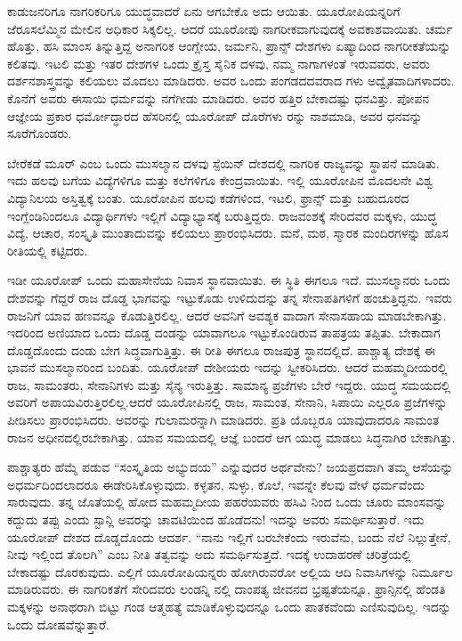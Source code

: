 ಕಾಡುಜನರಿಗೂ ನಾಗರಿಕರಿಗೂ ಯುದ್ಧವಾದರೆ ಏನು ಆಗಬೇಕೊ ಅದು ಆಯಿತು. ಯೂರೋಪಿಯನ್ನರಿಗೆ ಜೆರೂಸಲೆಮ್ಮಿನ ಮೇಲಿನ ಅಧಿಕಾರ ಸಿಕ್ಕಲಿಲ್ಲ. ಆದರೆ ಯೂರೋಪು ನಾಗರೀಕವಾಗುವುದಕ್ಕೆ ಅವಕಾಶವಾಯಿತು. ಚರ್ಮ ಹೊತ್ತು, ಹಸಿ ಮಾಂಸ ತಿನ್ನುತ್ತಿದ್ದ ಅನಾಗರಿಕ ಆಂಗ್ಲೇಯ, ಜರ್ಮನಿ, ಪ್ರಾನ್ಸ್​ ದೇಶಗಳು ಏಷ್ಯಾದಿಂದ ನಾಗರೀಕತೆಯನ್ನು ಕಲಿತವು. ಇಟಲಿ ಮತ್ತು ಇತರ ದೇಶಗಳ ಒಂದು ಕ್ರೈಸ್ತ ಸೈನಿಕ ದಳವು, ನಮ್ಮ ನಾಗಾಗಳಂತೆ ಇರುವವರು, ಅವರು ದರ್ಶನಶಾಸ್ತ್ರವನ್ನು ಕಲಿಯಲು ಮೊದಲು ಮಾಡಿದರು. ಅವರ ಒಂದು ಪಂಗಡದದವರಾದ ಗಳು ಅದ್ವೈತವಾದಿಗಳಾದರು. ಕೊನೆಗೆ ಅವರು ಈಸಾಯಿ ಧರ್ಮವನ್ನು ನಗೆಗೀಡು ಮಾಡಿದರು. ಅವರ ಹತ್ತಿರ ಬೇಕಾದಷ್ಟು ಧನವಿತ್ತು. ಪೋಪನ ಆಜ್ಞೇಯ ಪ್ರಕಾರ ಧರ್ಮೋದ್ಧಾರದ ಹೆಸರಿನಲ್ಲಿ ಯೂರೋಪ್​ ದೊರೆಗಳು ರನ್ನು ನಾಶಮಾಡಿ, ಅವರ ಧನವನ್ನು ಸೂರೆಗೊಂಡರು.

ಬೇರೆಕಡೆ ಮೂರ್​ ಎಂಬ ಒಂದು ಮುಸಲ್ಮಾನ ದಳವು ಸ್ಪೆಯಿನ್​ ದೇಶದಲ್ಲಿ ನಾಗರಿಕ ರಾಜ್ಯವನ್ನು ಸ್ಥಾಪನೆ ಮಾಡಿತು. ಇದು ಹಲವು ಬಗೆಯ ವಿದ್ಯೆಗಳಿಗೂ ಮತ್ತು ಕಲೆಗಳಿಗೂ ಕೇಂದ್ರವಾಯಿತು. ಇಲ್ಲಿ ಯೂರೋಪಿನ ಮೊದಲನೇ ವಿಶ್ವ ವಿದ್ಯಾನಿಲಯ ಅಸ್ತಿತ್ವಕ್ಕೆ ಬಂತು. ಯೂರೋಪಿನ ಹಲವು ಕಡೆಗಳಿಂದ, ಇಟಲಿ, ಫ್ರಾನ್ಸ್​ ಮತ್ತು ಬಹುದೂರದ ಇಂಗ್ಲೆಂಡಿನಿಂದಲೂ ವಿದ್ಯಾರ್ಥಿಗಳು ಇಲ್ಲಿಗೆ ವಿದ್ಯಾಭ್ಯಾಸಕ್ಕೆ ಬರುತ್ತಿದ್ದರು. ರಾಜವಂಶಕ್ಕೆ ಸೇರಿದವರ ಮಕ್ಕಳು, ಯುದ್ಧ ವಿದ್ಯೆ, ಆಚಾರ, ಸಂಸ್ಕೃತಿ ಮುಂತಾದುವನ್ನು ಕಲಿಯಲು ಪ್ರಾರಂಭಿಸಿದರು. ಮನೆ, ಮಠ, ಸ್ಮಾರಕ ಮಂದಿರಗಳನ್ನು ಹೊಸ ರೀತಿಯಲ್ಲಿ ಕಟ್ಟಿದರು.

ಇಡೀ ಯೂರೋಪ್​ ಒಂದು ಮಹಾಸೇನೆಯ ನಿವಾಸ ಸ್ಥಾನವಾಯಿತು. ಈ ಸ್ಥಿತಿ ಈಗಲೂ ಇದೆ. ಮುಸಲ್ಮಾನರು ಒಂದು ದೇಶವನ್ನು ಗೆದ್ದರೆ ರಾಜ ದೊಡ್ಡ ಭಾಗವನ್ನು ಇಟ್ಟುಕೊಡು ಉಳಿದುದನ್ನು ತನ್ನ ಸೇನಾಪತಿಗಳಿಗೆ ಹಂಚುತ್ತಿದ್ದನು. ಇವರು ರಾಜನಿಗೆ ಯಾವ ಹಣವನ್ನೂ ಕೊಡುತ್ತಿರಲಿಲ್ಲ. ಆದರೆ ಅವನಿಗೆ ಅವಶ್ಯಕ ವಾದಾಗ ಸೇನಾಸಹಾಯ ಮಾಡಬೇಕಾಗಿತ್ತು. ಇದರಿಂದ ಅಣಿಯಾದ ಒಂದು ದೊಡ್ಡ ದಂಡನ್ನು ಯಾವಾಗಲೂ ಇಟ್ಟುಕೊಂಡಿರುವ ತಾಪತ್ರಯ ತಪ್ಪಿತು. ಬೇಕಾದಾಗ ದೊಡ್ಡದೊಂದು ದಂಡು ಬೇಗ ಸಿದ್ಧವಾಗುತ್ತಿತ್ತು. ಈ ರೀತಿ ಈಗಲೂ ರಾಜಪುತ್ರ ಸ್ಥಾನದಲ್ಲಿದೆ. ಪಾಶ್ಚಾತ್ಯ ದೇಶಕ್ಕೆ ಈ ಭಾವನೆ ಮುಸಲ್ಮಾನರಿಂದ ಬಂದಿತು. ಯೂರೋಪ್​ ದೇಶೀಯರು ಇದನ್ನು ಸ್ವೀಕರಿಸಿದರು. ಆದರೆ ಮಹಮ್ಮದೀಯರಲ್ಲಿ ರಾಜ, ಸಾಮಂತರು, ಸೇನಾನಿಗಳು ಮತ್ತು ಸೈನ್ಯ ಇರುತ್ತಿತ್ತು. ಸಾಮಾನ್ಯ ಪ್ರಜೆಗಳು ಬೇರೆ ಇದ್ದರು. ಯುದ್ಧ ಸಮಯದಲ್ಲಿ ಅವರಿಗೆ ಅಪಾಯವಿರುತ್ತಿರಲಿಲ್ಲ.ಆದರೆ ಯೂರೋಪಿನಲ್ಲಿ ರಾಜ, ಸಾಮಂತ, ಸೇನಾನಿ, ಸಿಪಾಯಿ ಎಲ್ಲರೂ ಪ್ರಜೆಗಳನ್ನು ಪೀಡಿಸಲು ಪ್ರಾರಂಭಿಸಿದರು. ಅವರನ್ನು ಗುಲಾಮರನ್ನಾಗಿ ಮಾಡಿದರು. ಪ್ರತಿ ಯೊಬ್ಬರೂ ಯಾವುದಾದರೂ ಸಾಮಂತ ರಾಜನ ಅಧೀನದಲ್ಲಿರಬೇಕಾಗಿತ್ತು. ಯಾವ ಸಮಯದಲ್ಲಿ ಆಜ್ಞೆ ಬಂದರೆ ಆಗ ಯುದ್ಧ ಮಾಡಲು ಸಿದ್ಧನಾಗಿರ ಬೇಕಾಗಿತ್ತು.

ಪಾಶ್ಚಾತ್ಯರು ಹೆಮ್ಮೆ ಪಡುವ “ಸಂಸ್ಕೃತಿಯ ಅಭ್ಯುದಯ” ಎನ್ನುವುದರ ಅರ್ಥವೇನು? ಜಯಪ್ರದವಾಗಿ ತಮ್ಮ ಆಸೆಯನ್ನು ಅಧರ್ಮದಿಂದಲಾದರೂ ಈಡೇರಿಸಿಕೊಳ್ಳುವುದು. ಕಳ್ಳತನ, ಸುಳ್ಳು, ಕೊಲೆ, ಇವನ್ನೇ ಕೆಲವು ವೇಳೆ ಧರ್ಮವೆಂದು ಸಾರುವುದು. ತನ್ನ ಜೊತೆಯಲ್ಲಿ ಹೋದ ಮಹಮ್ಮದೀಯ ಪಹರೆಯವರು ಹಸಿವಿ ನಿಂದ ಒಂದು ಚೂರು ಮಾಂಸವನ್ನು ಕದ್ದುದು ತಪ್ಪು ಎಂದು ಸ್ಟಾನ್ಲಿ ಅವರನ್ನು ಚಾವಟಿಯಿಂದ ಹೊಡೆದನು! ಇದನ್ನು ಅವರು ಸಮರ್ಥಿಸುತ್ತಾರೆ. ಇದು ಯೂರೋಪ್​ ದೇಶದ ದೊಡ್ಡದೊಂದು ಆದರ್ಶ. “ನಾನು ಇಲ್ಲಿಗೆ ಬರಬೇಕೆಂದು ಇರುವೆನು, ಬಂದು ನೆಲೆ ನಿಲ್ಲುತ್ತೇನೆ, ನೀವು ಇಲ್ಲಿಂದ ತೊಲಗಿ” ಎಂಬ ನೀತಿ ತತ್ವವನ್ನು ಅದು ಸಮರ್ಥಿಸುತ್ತದೆ. ಇದಕ್ಕೆ ಉದಾಹರಣೆ ಚರಿತ್ರೆಯಲ್ಲಿ ಬೇಕಾದಷ್ಟು ದೊರಕುವುದು. ಎಲ್ಲಿಗೆ ಯೂರೋಪಿಯನ್ನರು ಹೋಗಿರುವರೋ ಅಲ್ಲಿಯ ಆದಿ ನಿವಾಸಿಗಳನ್ನು ನಿರ್ಮೂಲ ಮಾಡಿರುವರು. ಈ ನಾಗರಿಕತೆಗೆ ಸೇರಿದವರು ಲಂಡನ್ನಿ ನಲ್ಲಿ ದಾಂಪತ್ಯ ಜೀವನದ ಭ್ರಷ್ಟತೆಯನ್ನೂ, ಫ್ರಾನ್ಸಿನಲ್ಲಿ ಹೆಂಡತಿ ಮಕ್ಕಳನ್ನು ಅನಾಥರಾಗಿ ಬಿಟ್ಟು ಗಂಡ ಆತ್ಮಹತ್ಯೆ ಮಾಡಿಕೊಳ್ಳುವುದನ್ನೂ ಒಂದು ಪಾತಕವೆಂದು ಎಣಿಸುವುದಿಲ್ಲ. ಇದನ್ನು ಒಂದು ದೋಷವೆನ್ನುತ್ತಾರೆ.

